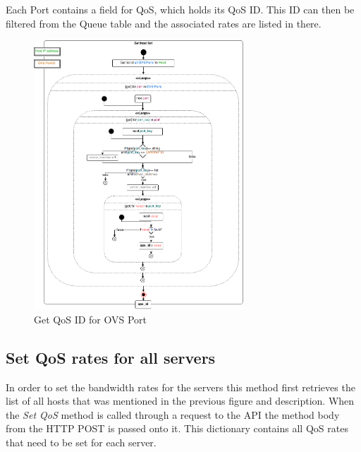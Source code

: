 Each Port contains a field for QoS, which holds its QoS ID. This ID can then be filtered from the Queue table and the associated rates are listed in there.

\begin{figure}[H]
\centering

\includegraphics[width=0.7\textwidth]{images/implementation/cma_get_qos_id_for_ovs_port}

\caption{Get QoS ID for OVS Port}
\end{figure}

\subsection{Set QoS rates for all servers}

In order to set the bandwidth rates for the servers this method first retrieves the list of all hosts that was mentioned in the previous figure and description. When the \textit{Set QoS} method is called through a request to the API the method body from the HTTP POST is passed onto it. This dictionary contains all QoS rates that need to be set for each server. 


